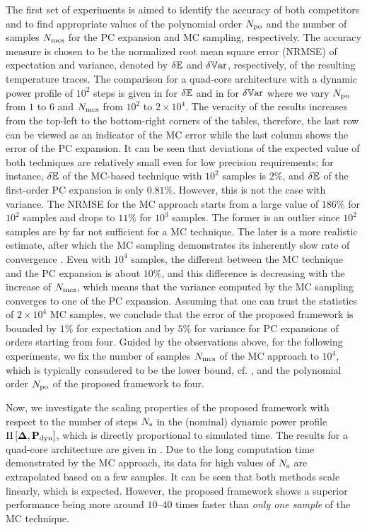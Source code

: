 

The first set of experiments is aimed to identify the accuracy of both competitors and to find appropriate values of the polynomial order ${N_\text{po}}$ and the number of samples $N_\text{mcs}$ for the PC expansion and MC sampling, respectively. The accuracy measure is chosen to be the normalized root mean square error (NRMSE) of expectation and variance, denoted by $\delta\mathbb{E}$ and $\delta\mathbb{V}\text{ar}$, respectively, of the resulting temperature traces. The comparison for a quad-core architecture with a dynamic power profile of $10^2$ steps is given in  for $\delta\mathbb{E}$ and in  for $\delta\mathbb{V}\text{ar}$ where we vary ${N_\text{po}}$ from $1$ to $6$ and $N_\text{mcs}$ from $10^2$ to $2 \times 10^4$. The veracity of the results increases from the top-left to the bottom-right corners of the tables, therefore, the last row can be viewed as an indicator of the MC error while the last column shows the error of the PC expansion. It can be seen that deviations of the expected value of both techniques are relatively small even for low precision requirements; for instance, $\delta\mathbb{E}$ of the MC-based technique with $10^2$ samples is $2\%$, and $\delta\mathbb{E}$ of the first-order PC expansion is only $0.81\%$. However, this is not the case with variance. The NRMSE for the MC approach starts from a large value of $186\%$ for $10^2$ samples and drops to $11\%$ for $10^3$ samples. The former is an outlier since $10^2$ samples are by far not sufficient for a MC technique. The later is a more realistic estimate, after which the MC sampling demonstrates its inherently slow rate of convergence \cite{xiu2009, maitre2010}. Even with $10^4$ samples, the different between the MC technique and the PC expansion is about $10\%$, and this difference is decreasing with the increase of $N_\text{mcs}$, which means that the variance computed by the MC sampling converges to one of the PC expansion. Assuming that one can trust the statistics of $2 \times 10^4$ MC samples, we conclude that the error of the proposed framework is bounded by $1\%$ for expectation and by $5\%$ for variance for PC expansions of orders starting from four. Guided by the observations above, for the following experiments, we fix the number of samples $N_\text{mcs}$ of the MC approach to $10^4$, which is typically consudered to be the lower bound, cf. \cite{xiu2009, bhardwaj2006}, and the polynomial order ${N_\text{po}}$ of the proposed framework to four.


Now, we investigate the scaling properties of the proposed framework with respect to the number of steps $N_\text{s}$ in the (nominal) dynamic power profile $\prof{\mP_\dyn}$, which is directly proportional to simulated time. The results for a quad-core architecture are given in . Due to the long computation time demonstrated by the MC approach, its data for high values of $N_\text{s}$ are extrapolated based on a few samples. It can be seen that both methods scale linearly, which is expected. However, the proposed framework shows a superior performance being more around $10$--$40$ times faster than \emph{only one sample} of the MC technique.

